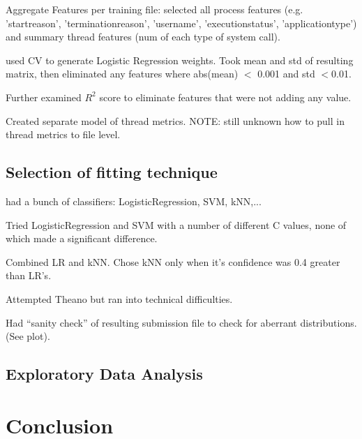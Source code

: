 \documentclass[11pt, oneside]{article}   	%
\begin{document}
Aggregate Features per training file:
 selected all process features  (e.g. 'startreason', 'terminationreason', 'username', 'executionstatus', 'applicationtype') and summary thread features (num of each type of system call).

used CV to generate Logistic Regression weights. Took mean and std of resulting matrix, then eliminated any features where abs(mean) $<$ 0.001 and std $< $0.01.

Further examined $R^2$ score to eliminate features that were not adding any value.

Created separate model of thread metrics. NOTE: still unknown how to pull in thread metrics to file level.

\subsection*{Selection of fitting technique}
had a bunch of classifiers: LogisticRegression, SVM, kNN,...


Tried LogisticRegression and SVM with a number of different C values, none of which made a significant difference.

Combined LR and kNN. Chose kNN only when it's confidence was 0.4 greater than LR's.

Attempted Theano but ran into technical difficulties.

Had ``sanity check'' of resulting submission file to check for aberrant distributions. (See plot).

\subsection*{Exploratory Data Analysis}

\section*{Conclusion}
\end{document}
